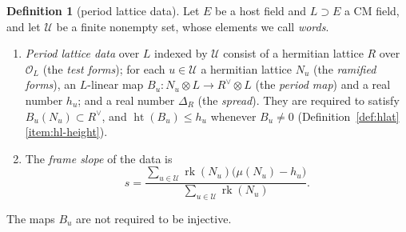\documentclass[11pt]{amsbook}
\theoremstyle{plain}
\theoremstyle{definition}
\newtheorem{definition}[theorem]{Definition}
\theoremstyle{remark}
\numberwithin{equation}{section}
\numberwithin{figure}{chapter}
\numberwithin{table}{chapter}
\newcommand{\rk}{\operatorname{rk}}
\newcommand{\Words}{\mathcal{U}}
\begin{document}
\begin{definition}[period lattice data]\label{def:period-lattice}
Let $E$ be a host field and $L\supset E$ a CM field, and let
$\Words$ be a finite nonempty set, whose elements we call
\emph{words}.
\begin{enumerate}[label=(\arabic*)]
\item \emph{Period lattice data} over $L$ indexed by $\Words$ consist
of a hermitian lattice $R$ over $\mathcal O_L$ (the \emph{test forms});
for each $u\in\Words$ a hermitian lattice $N_u$ (the \emph{ramified
forms}), an $L$-linear map $B_u\colon N_u\otimes L\to R^\vee\otimes L$
(the \emph{period map}) and a real number $h_u$; and a real number
$\Delta_R$ (the \emph{spread}). They are required to satisfy
$B_u(N_u)\subset R^\vee$, and $\operatorname{ht}(B_u)\le h_u$ whenever
$B_u\ne0$ (Definition~\ref{def:hlat}\ref{item:hl-height}).
\item The \emph{frame slope} of the data is
\[
s=\frac{\sum_{u\in\Words}\rk(N_u)\bigl(\mu(N_u)-h_u\bigr)}
{\sum_{u\in\Words}\rk(N_u)}.
\]
\end{enumerate}
\end{definition}

\noindent The maps $B_u$ are not required to be injective.
\end{document}
